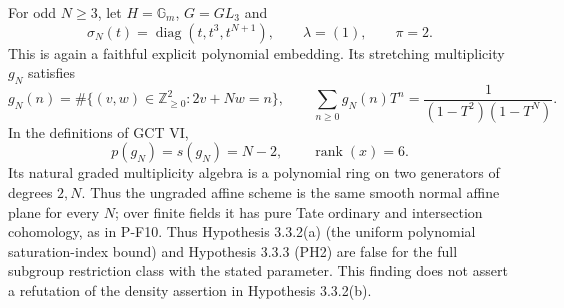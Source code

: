 \begin{proposition}
\label{prop:torusindices}
For odd $N\ge3$, let $H=\mathbb G_m$, $G=GL_3$ and
\[
 \sigma_N(t)=\operatorname{diag}(t,t^3,t^{N+1}),
 \qquad \lambda=(1),\qquad\pi=2.
\]
This is again a faithful explicit polynomial embedding. Its stretching
multiplicity $g_N$ satisfies
\[
 g_N(n)=\#\{(v,w)\in\mathbb Z_{\ge0}^2:2v+Nw=n\},
 \qquad
 \sum_{n\ge0}g_N(n)T^n=\frac1{(1-T^2)(1-T^N)}.
\]
In the definitions of GCT VI,
\[
 p(g_N)=s(g_N)=N-2,
 \qquad \operatorname{rank}(x)=6.
 \tag{P-F15}
\]
Its natural graded multiplicity algebra is a polynomial ring on two
generators of degrees $2,N$. Thus the ungraded affine scheme is the
same smooth normal affine plane for every $N$; over finite fields it
has pure Tate ordinary and intersection cohomology, as in P-F10.
Thus Hypothesis 3.3.2(a) (the uniform polynomial saturation-index
bound) and Hypothesis 3.3.3 (PH2) are false for the full subgroup
restriction class with the stated parameter. This finding does not
assert a refutation of the density assertion in Hypothesis 3.3.2(b).
\end{proposition}

